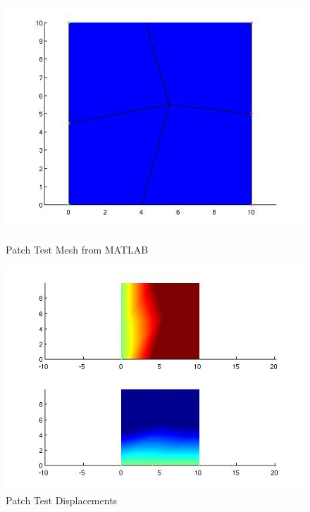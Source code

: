 \begin{figure}[htbp]
  \begin{minipage}{0.45\linewidth}
    \includegraphics[width=\linewidth]{fig/patch_test_mesh_matlab.jpg}
    \caption{Patch Test Mesh from MATLAB}
    \label{fig:PatchTestMeshMATLAB}
  \end{minipage}
  \hfill
  \begin{minipage}{0.45\linewidth}
    \includegraphics[width=\linewidth]{fig/patch_test_disp_matlab.jpg}
    \caption{Patch Test Displacements}
    \label{fig:PatchTestDisplacements}
  \end{minipage}
\end{figure}

\clearpage
